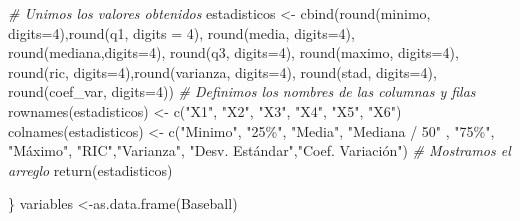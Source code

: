 \documentclass{staprojteamusb}
\newenvironment{Shaded}{\begin{snugshade}}{\end{snugshade}}
\newcommand{\AttributeTok}[1]{\textcolor[rgb]{0.77,0.63,0.00}{#1}}
\newcommand{\CommentTok}[1]{\textcolor[rgb]{0.56,0.35,0.01}{\textit{#1}}}
\newcommand{\DecValTok}[1]{\textcolor[rgb]{0.00,0.00,0.81}{#1}}
\newcommand{\FunctionTok}[1]{\textcolor[rgb]{0.00,0.00,0.00}{#1}}
\newcommand{\NormalTok}[1]{#1}
\newcommand{\OtherTok}[1]{\textcolor[rgb]{0.56,0.35,0.01}{#1}}
\newcommand{\StringTok}[1]{\textcolor[rgb]{0.31,0.60,0.02}{#1}}
\begin{document}
\begin{Shaded}
\begin{Highlighting}[]
  \CommentTok{\# Unimos los valores obtenidos}
\NormalTok{  estadisticos }\OtherTok{\textless{}{-}} \FunctionTok{cbind}\NormalTok{(}\FunctionTok{round}\NormalTok{(minimo, }\AttributeTok{digits=}\DecValTok{4}\NormalTok{),}\FunctionTok{round}\NormalTok{(q1, }\AttributeTok{digits =} \DecValTok{4}\NormalTok{),}
                        \FunctionTok{round}\NormalTok{(media, }\AttributeTok{digits=}\DecValTok{4}\NormalTok{), }\FunctionTok{round}\NormalTok{(mediana,}\AttributeTok{digits=}\DecValTok{4}\NormalTok{),}
                        \FunctionTok{round}\NormalTok{(q3, }\AttributeTok{digits=}\DecValTok{4}\NormalTok{), }\FunctionTok{round}\NormalTok{(maximo, }\AttributeTok{digits=}\DecValTok{4}\NormalTok{),}
                        \FunctionTok{round}\NormalTok{(ric, }\AttributeTok{digits=}\DecValTok{4}\NormalTok{),}\FunctionTok{round}\NormalTok{(varianza, }\AttributeTok{digits=}\DecValTok{4}\NormalTok{), }
                        \FunctionTok{round}\NormalTok{(stad, }\AttributeTok{digits=}\DecValTok{4}\NormalTok{), }\FunctionTok{round}\NormalTok{(coef\_var, }\AttributeTok{digits=}\DecValTok{4}\NormalTok{))}
  \CommentTok{\# Definimos los nombres de las columnas y filas}
  \FunctionTok{rownames}\NormalTok{(estadisticos) }\OtherTok{\textless{}{-}} \FunctionTok{c}\NormalTok{(}\StringTok{"X1"}\NormalTok{, }\StringTok{"X2"}\NormalTok{, }\StringTok{"X3"}\NormalTok{, }\StringTok{"X4"}\NormalTok{, }\StringTok{"X5"}\NormalTok{, }\StringTok{"X6"}\NormalTok{) }
  \FunctionTok{colnames}\NormalTok{(estadisticos) }\OtherTok{\textless{}{-}} \FunctionTok{c}\NormalTok{(}\StringTok{"Minimo"}\NormalTok{, }\StringTok{"25\%"}\NormalTok{, }\StringTok{"Media"}\NormalTok{, }\StringTok{"Mediana / 50"}\NormalTok{ ,}
                              \StringTok{"75\%"}\NormalTok{, }\StringTok{"Máximo"}\NormalTok{, }\StringTok{"RIC"}\NormalTok{,}\StringTok{"Varianza"}\NormalTok{, }
                              \StringTok{"Desv. Estándar"}\NormalTok{,}\StringTok{"Coef. Variación"}\NormalTok{)}
  \CommentTok{\# Mostramos el arreglo}
  \FunctionTok{return}\NormalTok{(estadisticos)}
  
\NormalTok{\}}
\NormalTok{variables }\OtherTok{\textless{}{-}}\FunctionTok{as.data.frame}\NormalTok{(Baseball)}
\end{Highlighting}
\end{Shaded}

	
	
	\nocite{*}
	\printbibliography
	
	
	
	
\end{document}

